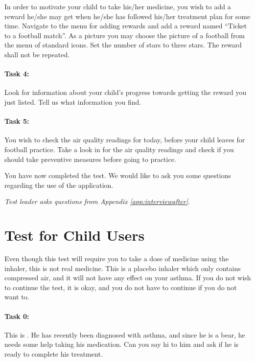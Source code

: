 In order to motivate your child to take his/her medicine, you wish to add a reward he/she may get when he/she has followed his/her treatment plan for some time. 
Navigate to the menu for adding rewards and add a reward named ``Ticket to a football match''. As a picture you may choose the picture of a football from the menu of standard icons. Set the number of stars to three stars. The reward shall not be repeated. 


\paragraph{Task 4:}

Look for information about your child's progress towards getting the reward you just listed. Tell us what information you find.

\paragraph{Task 5:}

You wish to check the air quality readings for today, before your child leaves for football practice. Take a look in for the air quality readings and check if you should take preventive measures before going to practice.  

You have now completed the test. We would like to ask you some questions regarding the use of the application. 

\emph{Test leader asks questions from Appendix \ref{app:interviewafter}}.

\section{Test for Child Users}
\label{sec:childtest}

Even though this test will require you to take a dose of medicine using the inhaler, this is not real medicine. This is a placebo inhaler which only contains compressed air, and it will not have any effect on your asthma. If you do not wish to continue the test, it is okay, and you do not have to continue if you do not want to. 
 
\paragraph{Task 0:}

This is \ab{}. He has recently been diagnosed with asthma, and since he is a bear, he needs some help taking his medication. Can you say hi to him and ask if he is ready to complete his treatment. 

